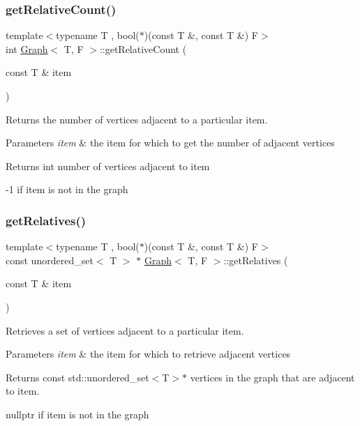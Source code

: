 \subsubsection{\texorpdfstring{get\+Relative\+Count()}{getRelativeCount()}}
{\footnotesize\ttfamily template$<$typename T , bool($\ast$)(const T \&, const T \&) F$>$ \\
int \hyperlink{class_graph}{Graph}$<$ T, F $>$\+::get\+Relative\+Count (\begin{DoxyParamCaption}\item[{const T \&}]{item }\end{DoxyParamCaption})}



Returns the number of vertices adjacent to a particular item. 


\begin{DoxyParams}{Parameters}
{\em item} & the item for which to get the number of adjacent vertices \\
\hline
\end{DoxyParams}
\begin{DoxyReturn}{Returns}
int number of vertices adjacent to item 

-\/1 if item is not in the graph 
\end{DoxyReturn}
\mbox{\label{class_graph_add90c1bc37771d0bf57515fd30d4c6c4}} 
\subsubsection{\texorpdfstring{get\+Relatives()}{getRelatives()}}
{\footnotesize\ttfamily template$<$typename T , bool($\ast$)(const T \&, const T \&) F$>$ \\
const unordered\+\_\+set$<$ T $>$ $\ast$ \hyperlink{class_graph}{Graph}$<$ T, F $>$\+::get\+Relatives (\begin{DoxyParamCaption}\item[{const T \&}]{item }\end{DoxyParamCaption})}



Retrieves a set of vertices adjacent to a particular item. 


\begin{DoxyParams}{Parameters}
{\em item} & the item for which to retrieve adjacent vertices \\
\hline
\end{DoxyParams}
\begin{DoxyReturn}{Returns}
const std\+::unordered\+\_\+set$<$\+T$>$$\ast$ vertices in the graph that are adjacent to item. 

nullptr if item is not in the graph 
\end{DoxyReturn}
\mbox{\label{class_graph_a30e9323548d265416291e975cfed93db}} 
